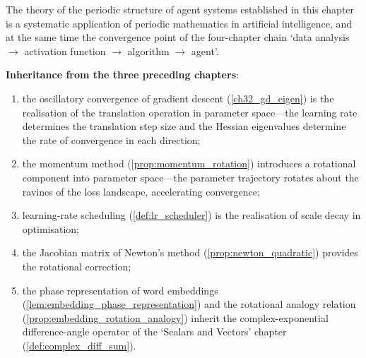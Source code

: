 \begin{remark}\label{rem:agent_chapter_unity}
The theory of the periodic structure of agent systems established in this chapter is a systematic application of periodic mathematics in artificial intelligence, and at the same time the convergence point of the four-chapter chain `data analysis $\to$ activation function $\to$ algorithm $\to$ agent'.

\textbf{Inheritance from the three preceding chapters}:
\begin{enumerate}[label=(\roman*)]
    \item the oscillatory convergence of gradient descent (\cref{ch32_gd_eigen}) is the realisation of the translation operation in parameter space---the learning rate determines the translation step size and the Hessian eigenvalues determine the rate of convergence in each direction;
    \item the momentum method (\cref{prop:momentum_rotation}) introduces a rotational component into parameter space---the parameter trajectory rotates about the ravines of the loss landscape, accelerating convergence;
    \item learning-rate scheduling (\cref{def:lr_scheduler}) is the realisation of scale decay in optimisation;
    \item the Jacobian matrix of Newton's method (\cref{prop:newton_quadratic}) provides the rotational correction;
    \item the phase representation of word embeddings (\cref{lem:embedding_phase_representation}) and the rotational analogy relation (\cref{prop:embedding_rotation_analogy}) inherit the complex-exponential difference-angle operator of the `Scalars and Vectors' chapter (\cref{def:complex_diff_sum}).
\end{enumerate}


\end{remark}
